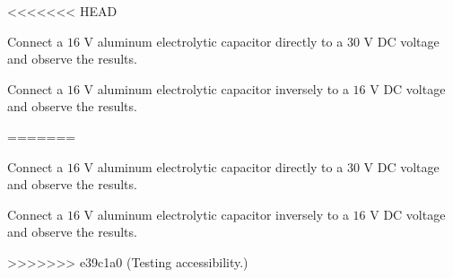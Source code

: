 \documentclass[11pt]{article}
\begin{document}

\begin{question}

<<<<<<< HEAD

\begin{subquestion}{Connect a $16$ V aluminum electrolytic capacitor directly to a $30$ V DC voltage and observe the results.} 
\answer{}
\end{subquestion}

\begin{subquestion}{Connect a $16$ V aluminum electrolytic capacitor inversely to a $16$ V DC voltage and observe the results.} 
\answer{}
\end{subquestion}
=======

    \begin{subquestion}{Connect a $16$ V aluminum electrolytic capacitor directly to a $30$ V DC voltage and observe the results.}
        \answer{}
    \end{subquestion}

    \begin{subquestion}{Connect a $16$ V aluminum electrolytic capacitor inversely to a $16$ V DC voltage and observe the results.}
        \answer{}
    \end{subquestion}
>>>>>>> e39c1a0 (Testing accessibility.)

\end{question}

\end{document}
